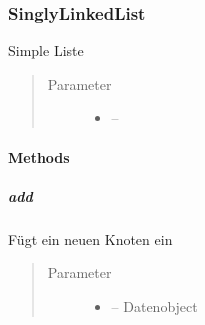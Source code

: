 \documentclass[letterpaper,10pt,ngerman]{sphinxmanual}
\begin{document}
\subsubsection{SinglyLinkedList}
\label{\detokenize{com/linuxluigi/edu/list/SinglyLinkedList::doc}}\label{\detokenize{com/linuxluigi/edu/list/SinglyLinkedList:singlylinkedlist}}

\begin{fulllineitems}
\label{\detokenize{com/linuxluigi/edu/list/SinglyLinkedList:com.linuxluigi.edu.list.SinglyLinkedList}}
Simple Liste
\begin{quote}\begin{description}
\item[{Parameter}] \leavevmode\begin{itemize}
\item {} 
 -- 

\end{itemize}

\end{description}\end{quote}

\end{fulllineitems}



\paragraph{Methods}
\label{\detokenize{com/linuxluigi/edu/list/SinglyLinkedList:methods}}

\subparagraph{add}
\label{\detokenize{com/linuxluigi/edu/list/SinglyLinkedList:add}}

\begin{fulllineitems}
\label{\detokenize{com/linuxluigi/edu/list/SinglyLinkedList:com.linuxluigi.edu.list.SinglyLinkedList.add(T)}}
Fügt ein neuen Knoten ein
\begin{quote}\begin{description}
\item[{Parameter}] \leavevmode\begin{itemize}
\item {} 
 -- Datenobject

\end{itemize}

\end{description}\end{quote}

\end{fulllineitems}
\end{document}
